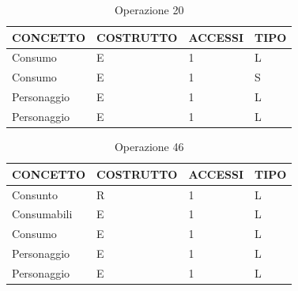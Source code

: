 \begin{table}[H]
\centering
\caption{Operazione 20}
\label{my-label}
\begin{tabular}{|l|l|l|l|}
\hline
\textbf{CONCETTO} & \textbf{COSTRUTTO} & \textbf{ACCESSI} & \textbf{TIPO} \\ \hline
Consumo           & E                  & 1                & L             \\ \hline
Consumo           & E                  & 1                & S             \\ \hline
Personaggio       & E                  & 1                & L             \\ \hline
Personaggio       & E                  & 1                & L             \\ \hline
\end{tabular}
\end{table}

\begin{table}[H]
\centering
\caption{Operazione 46}
\label{my-label}
\begin{tabular}{|l|l|l|l|}
\hline
\textbf{CONCETTO} & \textbf{COSTRUTTO} & \textbf{ACCESSI} & \textbf{TIPO} \\ \hline
Consunto          & R                  & 1                & L             \\ \hline
Consumabili       & E                  & 1                & L             \\ \hline
Consumo           & E                  & 1                & L             \\ \hline
Personaggio       & E                  & 1                & L             \\ \hline
Personaggio       & E                  & 1                & L             \\ \hline
\end{tabular}
\end{table}




